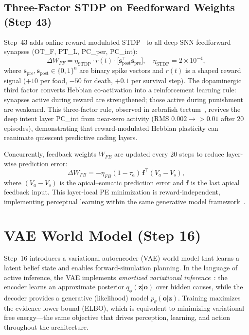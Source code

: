 \documentclass[11pt,a4paper]{article}
\begin{document}
\subsection{Three-Factor STDP on Feedforward Weights (Step 43)}\label{sec:stdp}

Step~43 adds online reward-modulated STDP~\cite{fremaux2016} to all deep
SNN feedforward synapses (OT\_F, PT\_L, PC\_per, PC\_int):
\begin{equation}\label{eq:stdp_ff}
  \Delta W_{FF} = \eta_\text{STDP}\cdot r(t)\cdot
    \bigl[\mathbf{s}_\text{post}^\top\mathbf{s}_\text{pre}\bigr],
  \quad \eta_\text{STDP} = 2\times10^{-4},
\end{equation}
where $\mathbf{s}_\text{pre},\mathbf{s}_\text{post} \in \{0,1\}^n$
are binary spike vectors and $r(t)$ is a shaped reward signal
($+10$ per food, $-50$ for death, $+0.1$ per survival step).
The dopaminergic third factor converts Hebbian co-activation into a
reinforcement learning rule: synapses active during reward are
strengthened; those active during punishment are weakened.
This three-factor rule, observed in zebrafish tectum~\cite{bhatt2009},
revives the deep intent layer PC\_int from near-zero activity
(RMS $0.002 \to >0.01$ after 20 episodes), demonstrating that
reward-modulated Hebbian plasticity can reanimate quiescent
predictive coding layers.

Concurrently, feedback weights $W_{FB}$ are updated every 20 steps to
reduce layer-wise prediction error:
\begin{equation}
  \Delta W_{FB} = -\eta_{FB}(1-\tau_a)\,\mathbf{f}^\top(V_a - V_s),
\end{equation}
where $(V_a - V_s)$ is the apical--somatic prediction error and
$\mathbf{f}$ is the last apical feedback input.
This layer-local PE minimization is reward-independent, implementing
perceptual learning within the same generative model
framework~\cite{rao1999}.

\section{VAE World Model (Step 16)}\label{sec:vae}

Step~16 introduces a variational autoencoder (VAE) world model that learns a
latent belief state and enables forward-simulation planning.
In the language of active inference, the VAE implements \emph{amortized
variational inference}~\cite{kingma2014}: the encoder learns an approximate
posterior $q_\phi(\mathbf{z}|\mathbf{o})$ over hidden causes, while the
decoder provides a generative (likelihood) model $p_\theta(\mathbf{o}|\mathbf{z})$.
Training maximizes the evidence lower bound (ELBO), which is equivalent to
minimizing variational free energy---the same objective that drives
perception, learning, and action throughout the architecture.
\end{document}
